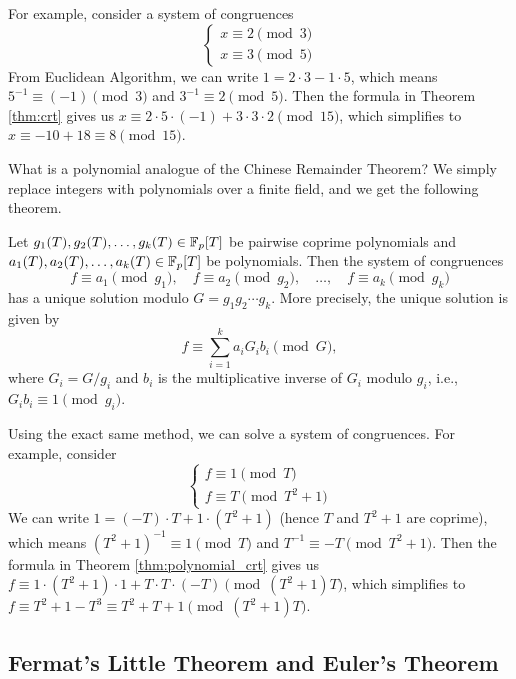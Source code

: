 For example, consider a system of congruences
\[
\begin{cases}
    x \equiv 2 \pmod{3} \\
    x \equiv 3 \pmod{5}
\end{cases}
\]
From Euclidean Algorithm, we can write $1 = 2 \cdot 3 - 1 \cdot 5$, which means $5^{-1} \equiv (-1) \pmod{3}$ and $3^{-1} \equiv 2 \pmod{5}$.
Then the formula in Theorem \ref{thm:crt} gives us $x \equiv 2 \cdot 5 \cdot (-1) + 3 \cdot 3 \cdot 2 \pmod{15}$, which simplifies to $x \equiv -10 + 18 \equiv 8 \pmod{15}$.

What is a polynomial analogue of the Chinese Remainder Theorem?
We simply replace integers with polynomials over a finite field, and we get the following theorem.
\begin{theorem}
    \label{thm:polynomial_crt}
    Let $g_1(T), g_2(T), \ldots, g_k(T) \in \mathbb{F}_p[T]$ be pairwise coprime polynomials and $a_1(T), a_2(T), \ldots, a_k(T) \in \mathbb{F}_p[T]$ be polynomials.
    Then the system of congruences
    \[
        f \equiv a_1 \pmod{g_1}, \quad f \equiv a_2 \pmod{g_2}, \quad \ldots, \quad f \equiv a_k \pmod{g_k}
    \]
    has a unique solution modulo $G = g_1 g_2 \cdots g_k$.
    More precisely, the unique solution is given by
    \[
        f \equiv \sum_{i=1}^k a_i G_i b_i \pmod{G},
    \]
    where $G_i = G / g_i$ and $b_i$ is the multiplicative inverse of $G_i$ modulo $g_i$, i.e., $G_i b_i \equiv 1 \pmod{g_i}$.
\end{theorem}

Using the exact same method, we can solve a system of congruences.
For example, consider
\[
\begin{cases}
    f \equiv 1 \pmod{T} \\
    f \equiv T \pmod{T^2 + 1}
\end{cases}
\]
We can write $1 = (-T) \cdot T + 1 \cdot (T^2 + 1)$ (hence $T$ and $T^2 + 1$ are coprime), which means $(T^2 + 1)^{-1} \equiv 1 \pmod{T}$ and $T^{-1} \equiv -T \pmod{T^2 + 1}$.
Then the formula in Theorem \ref{thm:polynomial_crt} gives us $f \equiv 1 \cdot (T^2 + 1) \cdot 1 + T \cdot T \cdot (-T) \pmod{(T^2 + 1)T}$, which simplifies to $f \equiv T^2 + 1 - T^3 \equiv T^2 + T + 1 \pmod{(T^2 + 1)T}$.

\subsection{Fermat's Little Theorem and Euler's Theorem}
\label{subsec:basicnt_flittlet}

